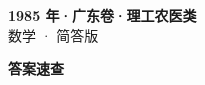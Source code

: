 \documentclass[zihao=-4, a4paper]{ctexart}
\begin{document}
\begin{center}
  {\Large\bfseries 1985 年·广东卷·理工农医类}\\[4pt]
  {\large 数学 · 简答版}
\end{center}
\medskip
{}

\clearpage
{}
\begin{center}{\Large\bfseries 答案速查}\end{center}
\medskip

\end{document}
